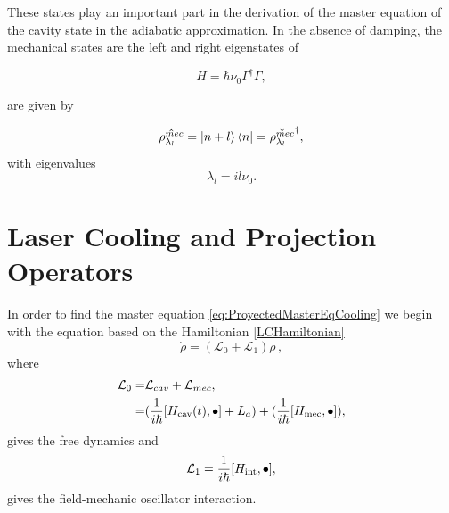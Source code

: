 \documentclass[reprint, amsmath,amssymb, aps,pra]{revtex4-1}
\begin{document}
These states play an important part in the derivation of the master
equation of the cavity state in the adiabatic approximation. In the absence of damping, the mechanical states are the left and right
eigenstates of 

\begin{equation}
H=\hbar\nu_0\Gamma^\dagger\Gamma,
\end{equation}

are given by

\begin{equation}
\hat{\rho_{\lambda_l}^{mec}}=\Ket{n+l}\Bra{n}=\check{\rho_{\lambda_l}^{mec}}^\dagger,
\end{equation} 
with eigenvalues
\begin{equation}
\lambda_l = i l \nu_0.
\end{equation}

\section{Laser Cooling and Projection Operators}\label{CoolingAppendix}

In order to find the master equation
\eqref{eq:ProyectedMasterEqCooling} we begin with the equation based on the Hamiltonian \eqref{LCHamiltonian}
\begin{equation}\label{eq:master_no_mechanical_damping}
\dot{\rho}=(\mathcal{L}_0+\mathcal{L}_1)\rho\, ,
\end{equation}
where
\begin{align}
\mathcal{L}_0=& \mathcal{L}_{cav} + \mathcal{L}_{mec},\\
 =&(\frac{1}{i\hbar}[H_{\rm cav}(t),\bullet]+L_a) +(\frac{1}{i\hbar}[H_{\rm mec},\bullet]), \nonumber
\end{align}
gives the free dynamics 
and
\begin{equation}
\mathcal{L}_1 = \frac{1}{i\hbar}[H_{\rm int},\bullet],
\end{equation}
gives the field-mechanic oscillator interaction.
\end{document}
